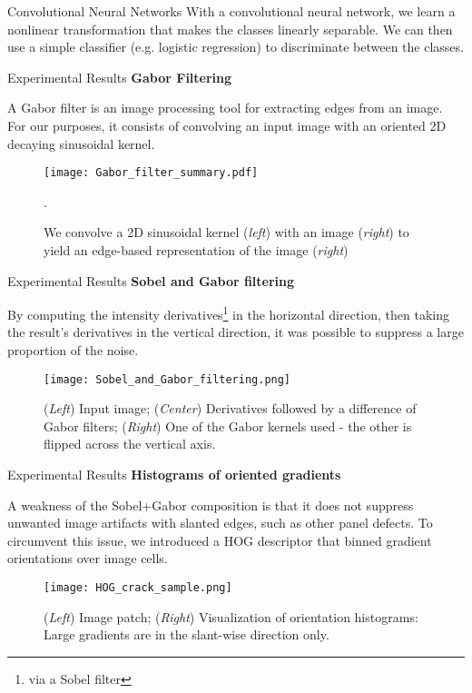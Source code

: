 \documentclass[10pt]{beamer}
\begin{document}
\begin{frame}{Convolutional Neural Networks}
	With a convolutional neural network, we learn a nonlinear transformation that makes the classes linearly separable. We can then use a simple classifier (e.g. logistic regression) to discriminate between the classes.
\end{frame}


\begin{frame}{Experimental Results}
\textbf{Gabor Filtering}

A Gabor filter is an image processing tool for extracting edges from an image. For our purposes, it consists of convolving an input image with an oriented 2D decaying sinusoidal kernel.

	\begin{figure}
		\texttt{[image: Gabor\_filter\_summary.pdf]}
		\caption{We convolve a 2D sinusoidal kernel (\emph{left}) with an image (\emph{right}) to yield an edge-based representation of the image (\emph{right})}. 
	\end{figure}	

\end{frame}

\begin{frame}{Experimental Results}
\textbf{Sobel and Gabor filtering}

By computing the intensity derivatives\footnote{via a Sobel filter} in the horizontal direction, then taking the result's derivatives in the vertical direction, it was possible to suppress a large proportion of the noise.

\begin{figure}
	\texttt{[image: Sobel\_and\_Gabor\_filtering.png]}
	\caption{(\emph{Left}) Input image; (\emph{Center}) Derivatives followed by a difference of Gabor filters; (\emph{Right}) One of the Gabor kernels used - the other is flipped across the vertical axis.}
\end{figure}

\end{frame}


\begin{frame}{Experimental Results}
\textbf{Histograms of oriented gradients}

A weakness of the Sobel+Gabor composition is that it does not suppress unwanted image artifacts with slanted edges, such as other panel defects. To circumvent this issue, we introduced a HOG descriptor that binned gradient orientations over image cells.

\begin{figure}
	\texttt{[image: HOG\_crack\_sample.png]}
	\caption{(\emph{Left}) Image patch; (\emph{Right}) Visualization of orientation histograms: Large gradients are in the slant-wise direction only.}
\end{figure}

\end{frame}
\end{document}

